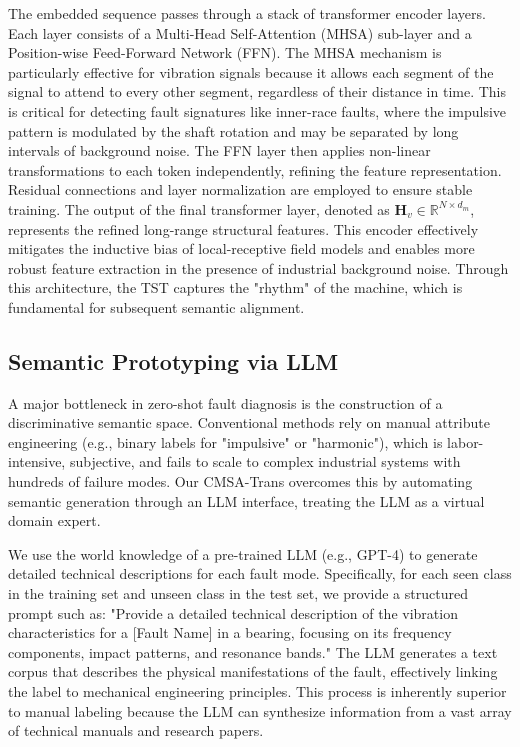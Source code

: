 \documentclass[journal]{IEEEtran}
\begin{document}
The embedded sequence passes through a stack of transformer encoder layers. Each layer consists of a Multi-Head Self-Attention (MHSA) sub-layer and a Position-wise Feed-Forward Network (FFN). The MHSA mechanism is particularly effective for vibration signals because it allows each segment of the signal to attend to every other segment, regardless of their distance in time. This is critical for detecting fault signatures like inner-race faults, where the impulsive pattern is modulated by the shaft rotation and may be separated by long intervals of background noise. The FFN layer then applies non-linear transformations to each token independently, refining the feature representation. Residual connections and layer normalization are employed to ensure stable training. The output of the final transformer layer, denoted as $\mathbf{H}_v \in \mathbb{R}^{N \times d_m}$, represents the refined long-range structural features. This encoder effectively mitigates the inductive bias of local-receptive field models and enables more robust feature extraction in the presence of industrial background noise. Through this architecture, the TST captures the "rhythm" of the machine, which is fundamental for subsequent semantic alignment.

\subsection{Semantic Prototyping via LLM}
A major bottleneck in zero-shot fault diagnosis is the construction of a discriminative semantic space. Conventional methods rely on manual attribute engineering (e.g., binary labels for "impulsive" or "harmonic"), which is labor-intensive, subjective, and fails to scale to complex industrial systems with hundreds of failure modes. Our CMSA-Trans overcomes this by automating semantic generation through an LLM interface, treating the LLM as a virtual domain expert.

We use the world knowledge of a pre-trained LLM (e.g., GPT-4) to generate detailed technical descriptions for each fault mode. Specifically, for each seen class in the training set and unseen class in the test set, we provide a structured prompt such as: "Provide a detailed technical description of the vibration characteristics for a [Fault Name] in a bearing, focusing on its frequency components, impact patterns, and resonance bands." The LLM generates a text corpus that describes the physical manifestations of the fault, effectively linking the label to mechanical engineering principles. This process is inherently superior to manual labeling because the LLM can synthesize information from a vast array of technical manuals and research papers.
\end{document}

